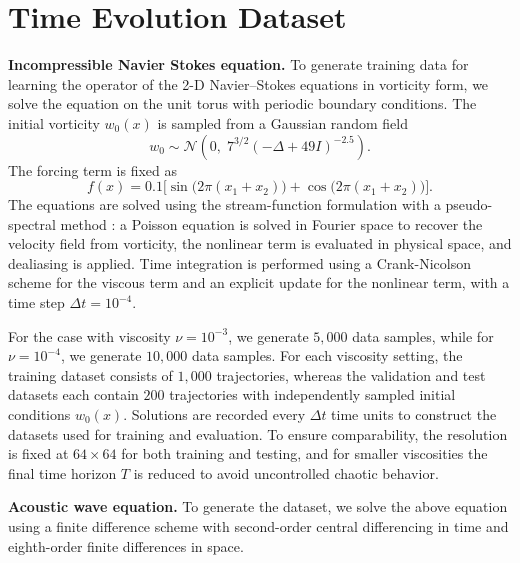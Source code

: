 \documentclass[preprint,numbers,sort&compress]{elsarticle}
\begin{document}
			
			
			\section{Time Evolution Dataset}   \label{secATeq}
			\textbf{Incompressible Navier Stokes equation.} 
			To generate training data for learning the operator of the 2-D Navier–Stokes equations in vorticity form, we solve the equation on the unit torus with periodic boundary conditions.
			The initial vorticity $w_0(x)$ is sampled from a Gaussian random field
			\begin{equation*}
				w_0 \sim \mathcal{N}\!\left(0,\; 7^{3/2}(-\Delta+49I)^{-2.5}\right).
			\end{equation*}
			The forcing term is fixed as
			\begin{equation*}
				f(x) = 0.1 \bigl[\sin\!\bigl(2\pi(x_1+x_2)\bigr) + \cos\!\bigl(2\pi(x_1+x_2)\bigr)\bigr].
			\end{equation*}
			The equations are solved using the stream-function formulation with a pseudo-spectral method \cite{shen2011spectral}:
			a Poisson equation is solved in Fourier space to recover the velocity field from vorticity,
			the nonlinear term is evaluated in physical space, and dealiasing is applied.
			Time integration is performed using a Crank-Nicolson scheme for the viscous term and an explicit update for the nonlinear term,
			with a time step $\Delta t = 10^{-4}$.
			
			For the case with viscosity $\nu = 10^{-3}$, we generate $5{,}000$ data samples, while for $\nu = 10^{-4}$, we generate $10{,}000$ data samples. For each viscosity setting, the training dataset consists of $1{,}000$ trajectories, whereas the validation and test datasets each contain $200$ trajectories with independently 
			sampled initial conditions $w_0(x)$. Solutions are recorded every $\Delta t$ time units to construct the datasets used for training and evaluation.
			To ensure comparability, the resolution is fixed at $64 \times 64$ for both training and testing,
			and for smaller viscosities the final time horizon $T$ is reduced to avoid uncontrolled chaotic behavior.
			
			\textbf{Acoustic wave equation.} 
			To generate the dataset, we solve the above equation using a finite difference scheme with second-order central differencing in time and eighth-order finite differences in space.
			
\end{document}
